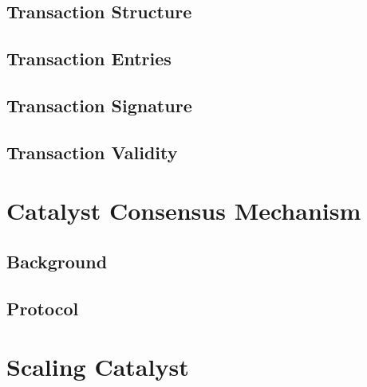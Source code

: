 \documentclass[a4paper, 12pt]{book}
\begin{document}
\section{Transaction Structure} \label{Sec:TStru}




\section{Transaction Entries}\label{Sec:TEnt}



\section{Transaction Signature}\label{Sec:Sig}




\section{Transaction Validity} \label{Sec:Val}





\chapter{Catalyst Consensus Mechanism} \label{Cha:CM}





\section{Background}\label{Sec:Cbg}



\section{Protocol}\label{Sec:Dem}




\chapter{Scaling Catalyst} \label{Cha:Sha}
\end{document}
